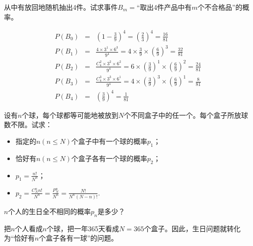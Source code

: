     \begin{example}[(放回抽样)]
    从中有放回地随机抽出4件。试求事件$B_m=$“取出4件产品中有$m$个不合格品”的概率。
    \end{example}
    \begin{solution}
        \begin{eqnarray*}
    P(B_0) &=& \left(1-\frac{3}{9}\right)^4 = \left(\frac{2}{3}\right)^4 = \frac{16}{81} \\
     P(B_1) &=&   \frac{4\times 3^1 \times 6^3}{9^4} =  4\times \frac{3}{9} \times \left(\frac{6}{9}\right)^3 = \frac{32}{81} \\
     P(B_2) &=&    \frac{C_4^2\times 3^2 \times 6^2}{9^4} =  6\times \left(\frac{3}{9}\right)^1 \times \left(\frac{6}{9}\right)^2 = \frac{24}{81} \\
      P(B_3) &=&    \frac{C_4^3\times 3^3 \times 6^1}{9^4} =  4\times \left(\frac{3}{9}\right)^3 \times \left(\frac{6}{9}\right)^1 = \frac{8}{81} \\
      P(B_4) &=&     \left(\frac{3}{9}\right)^4 = \frac{1}{81} 
    \end{eqnarray*}
    \end{solution}

  \begin{example}[(盒子模型)]
    设有$n$个球，每个球都等可能地被放到$N$个不同盒子中的任一个。每个盒子所放球数不限。试求：\\
    \begin{itemize}
    \item 指定的$n(n\leq N)$个盒子中有一个球的概率$p_1$；
    \item 恰好有$n(n\leq N)$个盒子各有一个球的概率$p_2$；
    \end{itemize}
    \end{example}
    \begin{solution}
        \begin{itemize}
        \item $p_1 = \frac{n!}{N^n}$；
        \item $p_2 = \frac{C_N^n n!}{N^n} = \frac{P_N^n}{N^n} = \frac{N!}{N^n(N-n)!}$.
    \end{itemize}
    \end{solution}
    

 \begin{example}[(生日问题)]
    $n$个人的生日全不相同的概率$p_n$是多少？
    \end{example}
    \begin{remark}
        把$n$个人看成$n$个球，把一年365天看成$N=365$个盒子。因此，生日问题就转化为“恰好有$n$个盒子各有一球”的问题。
    \end{remark}


